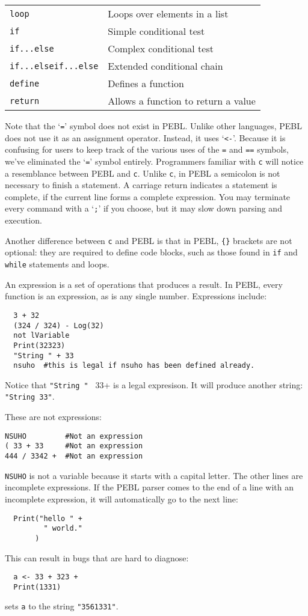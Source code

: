 \begin{table}[htbp]
\begin{tabular}{ll}
\texttt{loop}  &               Loops over elements in a list\\
\texttt{if}    &               Simple conditional test\\
\texttt{if...else}&            Complex conditional test\\
\texttt{if...elseif...else}&   Extended conditional chain\\
\texttt{define}   &            Defines a function\\
\texttt{return}&               Allows a function to return a value\\
\bottomrule
\end{tabular}
\label{tab:symbols}
\end{table}


Note that the `\verb+=+' symbol does not exist in PEBL. Unlike other languages, PEBL does not use it as an assignment operator. Instead, it uses `\verb+<-+'. Because it is confusing for users to keep track of the various uses of the \verb+=+ and \verb+==+ symbols, we've eliminated the `\verb+=+' symbol entirely. Programmers familiar with \texttt{c} will notice a resemblance between PEBL and \texttt{c}. Unlike \texttt{c}, in PEBL a semicolon is not necessary to finish a statement. A carriage return indicates a statement is complete, if the current line forms a complete expression. You may terminate every command with a `\texttt{;}' if you choose, but it may slow down parsing and execution.

Another difference between \texttt{c} and PEBL is that in PEBL, \verb+{}+ brackets are
not optional: they are required to define code blocks, such as those
found in \texttt{if} and \texttt{while} statements and loops.

\vfill
{}

An expression is a set of operations that produces a
result.  In PEBL, every function is an expression, as is any
single number. Expressions include:
\begin{verbatim}
  3 + 32
  (324 / 324) - Log(32)
  not lVariable
  Print(32323)
  "String " + 33
  nsuho  #this is legal if nsuho has been defined already.
\end{verbatim}

Notice that \verb+"String " + 33+ is a legal expresison. It will
produce another string: \verb+"String 33"+.

These are not expressions:
\begin{verbatim}
NSUHO         #Not an expression
( 33 + 33     #Not an expression
444 / 3342 +  #Not an expression
\end{verbatim}
\texttt{NSUHO} is not a variable because it starts with a capital
letter. The other lines are incomplete expressions.  If the PEBL parser comes
to the end of a line with an incomplete expression, it
will automatically go to the next line:
\begin{verbatim}
  Print("hello " +
         " world."
       )
\end{verbatim}
This can result in bugs that are hard to diagnose:
\begin{verbatim}
  a <- 33 + 323 +
  Print(1331)
\end{verbatim}
sets \texttt{a} to the string \texttt{"3561331"}.

